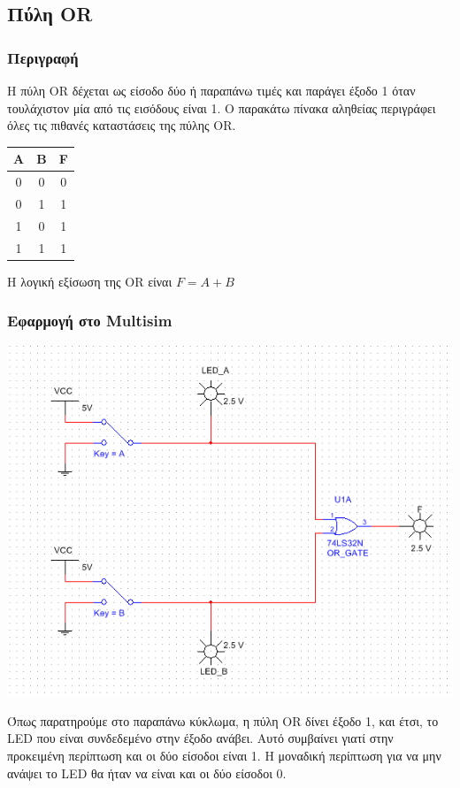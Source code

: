 \documentclass{article}
\begin{document}
\subsection{Πύλη OR}
\subsubsection{Περιγραφή}

Η πύλη OR δέχεται ως είσοδο δύο ή παραπάνω τιμές και παράγει έξοδο 1 όταν τουλάχιστον
μία από τις εισόδους είναι 1. Ο παρακάτω πίνακα αληθείας περιγράφει όλες τις πιθανές
καταστάσεις της πύλης OR.

\begin{center}
\begin{tabular}{|c|c|c|}
	\hline
	A & B & F \\
	\hline
	0 & 0 & 0 \\
	0 & 1 & 1 \\
	1 & 0 & 1 \\
	1 & 1 & 1 \\
	\hline
\end{tabular}
\end{center}

Η λογική εξίσωση της OR είναι $F = A + B$

\subsubsection{Εφαρμογή στο Multisim}
\includegraphics[width=\textwidth]{./res/or.png}

Όπως παρατηρούμε στο παραπάνω κύκλωμα, η πύλη OR δίνει έξοδο 1, και έτσι, το LED
που είναι συνδεδεμένο στην έξοδο ανάβει. Αυτό συμβαίνει γιατί στην προκειμένη
περίπτωση και οι δύο είσοδοι είναι 1. Η μοναδική περίπτωση για να μην ανάψει το LED
θα ήταν να είναι και οι δύο είσοδοι 0.
\end{document}
